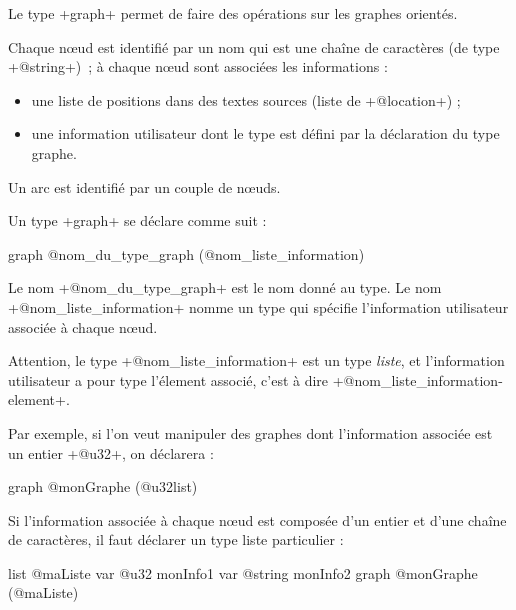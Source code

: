 



Le type \ggsq+graph+ permet de faire des opérations sur les graphes orientés.

Chaque nœud est identifié par un nom qui est une chaîne de caractères (de type \ggsq+@string+)~; à chaque nœud sont associées les informations :
\begin{itemize}
  \item une liste de positions dans des textes sources (liste de \ggsq+@location+) ;
  \item une information utilisateur dont le type est défini par la déclaration du type graphe.
\end{itemize}

Un arc est identifié par un couple de nœuds.


Un type \ggsq+graph+ se déclare comme suit :
\begin{galgas4}
graph @nom_du_type_graph (@nom_liste_information) {
}
\end{galgas4}

Le nom \ggsq+@nom_du_type_graph+ est le nom donné au type. Le nom \ggsq+@nom_liste_information+ nomme un type qui spécifie l'information utilisateur associée à chaque nœud.

Attention, le type \ggsq+@nom_liste_information+ est un type \emph{liste}, et l'information utilisateur a pour type l'élement associé, c'est à dire \ggsq+@nom_liste_information-element+.

Par exemple, si l'on veut manipuler des graphes dont l'information associée est un entier \ggsq+@u32+, on déclarera :
\begin{galgas4}
graph @monGraphe (@u32list) {
}
\end{galgas4}

Si l'information associée à chaque nœud est composée d'un entier et d'une chaîne de caractères, il faut déclarer un type liste particulier :
\begin{galgas4}
list @maListe {
  var @u32 monInfo1
  var @string monInfo2
}
graph @monGraphe (@maListe) {
}
\end{galgas4}






